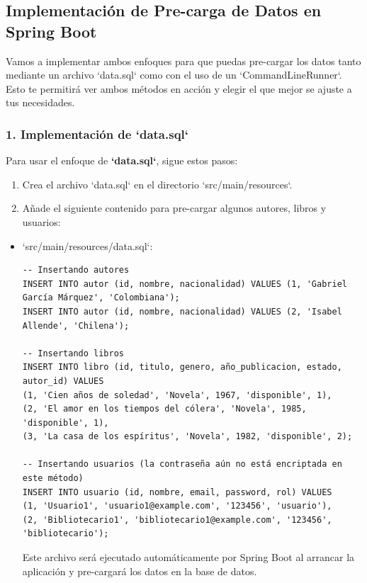 \documentclass[11pt]{article}
\begin{document}
\subsection{Implementación de Pre-carga de Datos en Spring Boot}
\label{sec:org2a6c5c6}

Vamos a implementar ambos enfoques para que puedas pre-cargar los datos tanto mediante un archivo `data.sql` como con el uso de un `CommandLineRunner`. Esto te permitirá ver ambos métodos en acción y elegir el que mejor se ajuste a tus necesidades.

\subsubsection{1. Implementación de `data.sql`}
\label{sec:orgea28903}

Para usar el enfoque de \textbf{\textbf{`data.sql`}}, sigue estos pasos:

\begin{enumerate}
\item Crea el archivo `data.sql` en el directorio `src/main/resources`.

\item Añade el siguiente contenido para pre-cargar algunos autores, libros y usuarios:
\end{enumerate}

\begin{itemize}
\item `src/main/resources/data.sql`:
\label{sec:orgf8eb0a8}

\begin{verbatim}
-- Insertando autores
INSERT INTO autor (id, nombre, nacionalidad) VALUES (1, 'Gabriel García Márquez', 'Colombiana');
INSERT INTO autor (id, nombre, nacionalidad) VALUES (2, 'Isabel Allende', 'Chilena');

-- Insertando libros
INSERT INTO libro (id, titulo, genero, año_publicacion, estado, autor_id) VALUES
(1, 'Cien años de soledad', 'Novela', 1967, 'disponible', 1),
(2, 'El amor en los tiempos del cólera', 'Novela', 1985, 'disponible', 1),
(3, 'La casa de los espíritus', 'Novela', 1982, 'disponible', 2);

-- Insertando usuarios (la contraseña aún no está encriptada en este método)
INSERT INTO usuario (id, nombre, email, password, rol) VALUES
(1, 'Usuario1', 'usuario1@example.com', '123456', 'usuario'),
(2, 'Bibliotecario1', 'bibliotecario1@example.com', '123456', 'bibliotecario');
\end{verbatim}

Este archivo será ejecutado automáticamente por Spring Boot al arrancar la aplicación y pre-cargará los datos en la base de datos.
\end{itemize}
\end{document}
